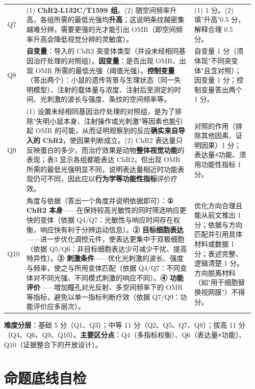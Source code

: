 \documentclass[UTF8,a4paper,11pt]{ctexart}
\newcommand{\key}[1]{\textbf{\color{deepred}#1}}
\begin{document}
\begin{longtable}{@{}p{0.9cm}p{9.6cm}p{4.2cm}@{}}
\addlinespace
Q7 & (1) \textbf{ChR2-L132C/T159S 组}。(2) 随空间频率升高，各组所需的最低光强均\key{升高}；这说明条纹越密集越难分辨，需要更强的光才能引出 OMR（即空间频率升高会降低视觉分辨的灵敏度）。 & (1) 1 分。(2) 填"升高"0.5 分，解释合理 0.5 分。 \\
\addlinespace
Q8 & \textbf{自变量}：导入的 ChR2 突变体类型（并设未经相同基因治疗处理的对照组）。\textbf{因变量}：是否出现 OMR、出现 OMR 所需的最低光强（阈值光强）。\textbf{控制变量}（答出两个）：小鼠的遗传背景与生理状态（同一失明模型）、注射的载体量与浓度、注射后至测定的时间、光刺激的波长与强度、条纹的空间频率等。 & 自变量 1 分（须体现"不同突变体"且含对照）；因变量 1 分；控制变量答出两个 1 分。 \\
\addlinespace
Q9 & (1) 设置未经相同基因治疗处理的对照组，是为了排除"失明小鼠本身、注射操作或光刺激"等因素也能引起 OMR 的可能，从而证明观察到的反应\textbf{确实来自导入的 ChR2}，使因果判断成立。(2) ChR2 表达量只反映蛋白的多少，而治疗效果是动物\textbf{整体视觉功能}的表现；表3 显示各组都能表达 ChR2，但出现 OMR 所需的最低光强明显不同，说明表达量相近时功能表现仍可不同，因此应以\textbf{行为学等功能性指标}评价疗效。 & 对照的作用（排除其他因素、证明因果）1 分；表达量≠功能、须用功能性指标 1 分。 \\
\addlinespace
Q10 & 角度与依据（答出一个角度并说明依据即可）：\textbf{① ChR2 本身}——在保持较高光敏性的同时筛选响应更快的变体（依据 Q4/Q7：光敏性与响应时间存在权衡，响应快有利于分辨运动信息）。\textbf{② 目标细胞表达}——进一步优化调控元件，使表达更集中于双极细胞（依据 Q5/Q6：非目标细胞表达少可减少干扰、提高特异性）。\textbf{③ 刺激条件}——优化光刺激的波长、强度与频率，使之与所用变体匹配（依据 Q4/Q7：不同变体对不同光强、不同模式刺激的响应不同）。\textbf{④ 功能评价}——增加瞳孔对光反射、多空间频率下的 OMR 等指标，避免以单一指标判断疗效（依据 Q7/Q9：功能评价应多层次）。 & 优化方向合理且能从前文推出 1 分；依据与方向匹配并引用具体材料或数据 1 分；表述完整、逻辑清楚 1 分。方向脱离材料（如"用干细胞替换视网膜"）不得分。 \\
\bottomrule
\end{longtable}

\noindent\textbf{难度分层}：基础 5 分（Q1、Q3）；中等 11 分（Q2、Q5、Q7、Q8）；拔高 11 分（Q4、Q6、Q9、Q10）。\textbf{主要区分点}：Q4（多指标权衡）、Q6（表达量≠功能）、Q10（证据整合下的开放设计）。

\clearpage
\section*{命题底线自检}
\end{document}
